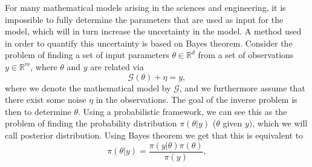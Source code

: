 For many mathematical models arising in the sciences and engineering, it is impossible to fully determine the parameters that are used as input for the model, which will in turn increase the uncertainty in the model. A method used in order to quantify this uncertainty is based on Bayes theorem. Consider the problem of finding a set of input parameters $\theta \in \mathbb{R}^d$ from a set of observations $y\in\mathbb{R}^m$, where $\theta$ and $y$ are related via \begin{equation}
\mathcal{G}(\theta)+\eta=y,
\end{equation}
where we  denote the mathematical model by $\mathcal{G}$, and we furthermore assume that there exist some noise $\eta$ in the observations.  The goal of the inverse problem is then to determine $\theta$. Using a probabilistic framework, we can see this as the problem of finding  the probability distribution $\pi(\theta|y)$ ($\theta$ given $y)$, which we will call posterior distribution. Using Bayes theorem we get that this is equivalent to \begin{equation}
\pi(\theta|y) =\frac{\pi(y|\theta)\pi(\theta)}{\pi(y)},\label{bi}
\end{equation}




